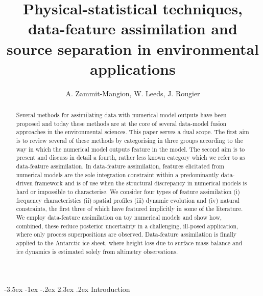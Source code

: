 \documentclass[10pt,a4paper]{article}
\title{Physical-statistical techniques, data-feature assimilation and source separation in environmental applications}
\author{A. Zammit-Mangion, W. Leeds, J. Rougier}
\makeatletter
\renewcommand\section{\@startsection{section}{1}{\z@}%
                                  {-3.5ex \@plus -1ex \@minus -.2ex}%
                                  {2.3ex \@plus.2ex}%
                                  {\normalfont\large\bfseries}}
\makeatother
\begin{document}
\maketitle

\begin{abstract}
Several methods for assimilating data with numerical model outputs have been proposed and today these methods are at the core of several data-model fusion approaches in the environmental sciences. This paper serves a dual scope. The first aim is to review several of these methods by categorising in three groups according to the way in which the numerical model outputs feature in the model. The second aim is to present and discuss in detail a fourth, rather less known category which we refer to as data-feature assimilation. In data-feature assimilation, features elicitated from numerical models are the sole integration constraint within a predominantly data-driven framework and is of use when the structural discrepancy in numerical models is hard or impossible to characterise. We consider four types of feature assimilation (i) frequency characteristics (ii) spatial profiles (iii) dynamic evolution and (iv) natural constraints, the first three of which have featured implicitly in some of the literature. We employ data-feature assimilation on toy numerical models and show how, combined, these reduce posterior uncertainty in a challenging, ill-posed application, where only process superpositions are observed. Data-feature assimilation is finally applied to the Antarctic ice sheet, where height loss due to surface mass balance and ice dynamics is estimated solely from altimetry observations.
\end{abstract}


\section{Introduction}
\end{document}
